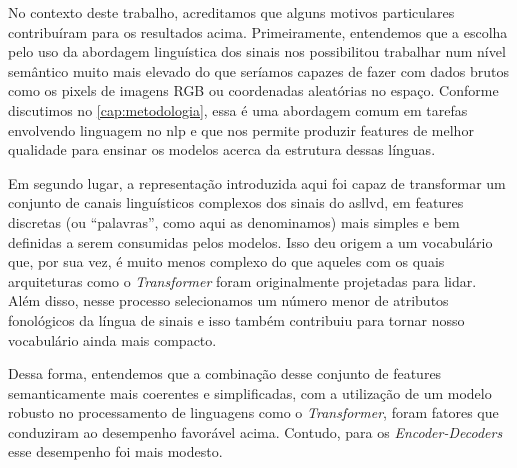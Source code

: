 No contexto deste trabalho, acreditamos que alguns motivos particulares contribuíram para os resultados acima.
Primeiramente, entendemos que a escolha pelo uso da abordagem linguística dos sinais nos possibilitou trabalhar num nível semântico muito mais elevado do que seríamos capazes de fazer com dados brutos como os pixels de imagens RGB ou coordenadas aleatórias no espaço. Conforme discutimos no \autoref{cap:metodologia}, essa é uma abordagem comum em tarefas envolvendo linguagem no \acrshort{nlp} e que nos permite produzir features de melhor qualidade para ensinar os modelos acerca da estrutura dessas línguas.

Em segundo lugar, a representação introduzida aqui foi capaz de transformar um conjunto de canais linguísticos complexos dos sinais do \acrshort{asllvd}, em features discretas (ou ``palavras'', como aqui as denominamos) mais simples e bem definidas a serem consumidas pelos modelos.
Isso deu origem a um vocabulário que, por sua vez, é muito menos complexo do que aqueles com os quais arquiteturas como o \textit{Transformer} foram originalmente projetadas para lidar. Além disso, nesse processo selecionamos um número menor de atributos fonológicos da língua de sinais e isso também contribuiu para tornar nosso vocabulário ainda mais compacto.

Dessa forma, entendemos que a combinação desse conjunto de features semanticamente mais coerentes e simplificadas, com a utilização de um modelo robusto no processamento de linguagens como o \textit{Transformer}, foram fatores que conduziram ao desempenho favorável acima.
Contudo, para os \textit{Encoder-Decoders} esse desempenho foi mais modesto.















